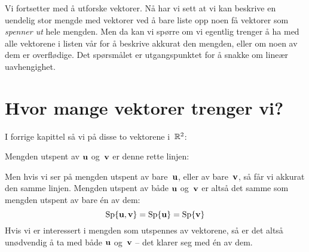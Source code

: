 

\label{ch:linear-uavhengighet}

Vi fortsetter med å utforske vektorer.  Nå har vi sett at vi kan
beskrive en uendelig stor mengde med vektorer ved å bare liste opp
noen få vektorer som \emph{spenner ut} hele mengden.  Men da kan vi
spørre om vi egentlig trenger å ha med alle vektorene i listen vår for
å beskrive akkurat den mengden, eller om noen av dem er overflødige.
Det spørsmålet er utgangspunktet for å snakke om lineær uavhengighet.

\section*{Hvor mange vektorer trenger vi?}

I forrige kapittel så vi på disse to vektorene i~$\mathbb{R}^2$:
\begin{center}
\end{center}
Mengden utspent av $\mathbf{u}$ og~$\mathbf{v}$ er denne rette linjen:
\begin{center}
\end{center}
Men hvis vi ser på mengden utspent av bare~$\mathbf{u}$, eller av bare~$\mathbf{v}$,
så får vi akkurat den samme linjen.  Mengden utspent av både $\mathbf{u}$
og~$\mathbf{v}$ er altså det samme som mengden utspent av bare én av dem:
\[
\operatorname{Sp}\{ \mathbf{u}, \mathbf{v} \} = \operatorname{Sp}\{ \mathbf{u} \} = \operatorname{Sp}\{ \mathbf{v} \}
\]
Hvis vi er interessert i mengden som utspennes av vektorene, så er det
altså unødvendig å ta med både $\mathbf{u}$ og~$\mathbf{v}$ -- det klarer seg med én
av dem.

